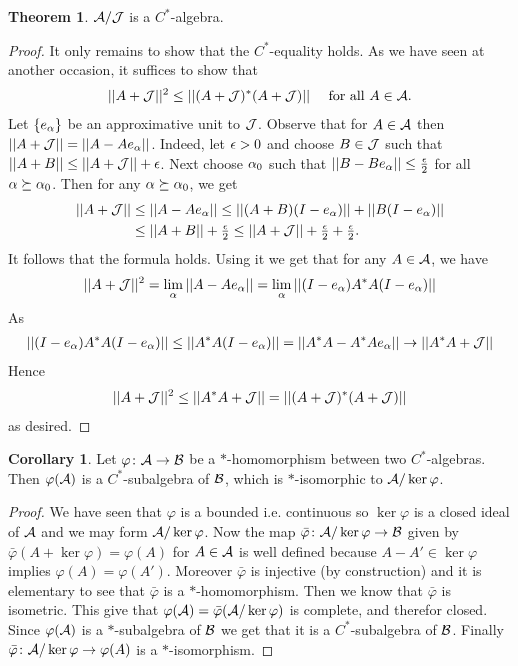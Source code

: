 \documentclass[10pt,english,a4paper]{article}
\theoremstyle{definition}
\newtheorem*{theorem}{Theorem}
\newtheorem*{corollary}{Corollary}
\begin{document}
\begin{theorem}
    $\mathcal{A} /\mathcal{J}$ is a $C^*$-algebra.
\end{theorem}
\begin{proof}
    It only remains to show that the $C^*$-equality holds. As we have seen at
another occasion, it suffices to show that 
\begin{align*}
    ||A+\mathcal{J}||^2 \leq ||(A + \mathcal{J})^*(A+ \mathcal{J})||\quad \text{ for all } A \in \mathcal{A}.
\end{align*}
Let $\{e_{\alpha}\}$ be an approximative unit to $\mathcal{J}$. Observe that for 
$A \in \mathcal{A}$ then $||A + \mathcal{J}|| = ||A-Ae_{\alpha}||$. 
Indeed, let $\epsilon > 0$ and choose $B \in \mathcal{J}$ such that 
$||A+B|| \leq ||A+\mathcal{J}|| + \epsilon$. Next choose $\alpha_0$ such that 
$||B-Be_{\alpha}|| \leq \tfrac{\epsilon}{2}$ for all $\alpha \succeq \alpha_0$. 
Then for any $\alpha \succeq \alpha_0$, we get
\begin{align*}
    ||A+\mathcal{J}|| &\leq ||A-Ae_{\alpha}|| \leq ||(A+B)(I-e_{\alpha})|| + ||B(I-e_{\alpha})|| \\
&\leq ||A+B|| + \tfrac{\epsilon}{2} \leq ||A+\mathcal{J}|| + \tfrac{\epsilon}{2}+ \tfrac{\epsilon}{2}.
\end{align*}
It follows that the formula holds. Using it we get that for any $A \in \mathcal{A}$,
we have
\begin{align*}
    ||A+\mathcal{J}||^2 &= \lim_{\alpha} ||A-Ae_{\alpha}|| = \lim_{\alpha} ||(I-e_{\alpha})A^*A (I-e_{\alpha})||\\
\end{align*}
As
\begin{align*}
    ||(I-e_{\alpha})A^*A (I-e_{\alpha})|| \leq ||A^*A (I-e_{\alpha})|| = ||A^*A-A^*Ae_{\alpha}|| \to || A^*A + \mathcal{J}|| 
\end{align*}
Hence 
\begin{align*}
||A + \mathcal{J}||^2 \leq ||A^*A + \mathcal{J}|| = ||(A + \mathcal{J})^*(A+\mathcal{J})||
\end{align*}
as desired. 
\end{proof}


\begin{corollary}
    Let $\varphi \colon \mathcal{A} \to \mathcal{B}$ be a $*$-homomorphism between two 
$C^*$-algebras. Then $\varphi(\mathcal{A})$ is a $C^*$-subalgebra of $\mathcal{B}$, which 
is $*$-isomorphic to $\mathcal{A} /\ker \varphi$. 
\end{corollary}
\begin{proof}
    We have seen that $\varphi$ is a bounded i.e. continuous so $\ker\varphi$
is a closed ideal of $\mathcal{A}$ and we may form $\mathcal{A}/\ker\varphi$.
Now the map $\bar{\varphi}\colon \mathcal{A}/\ker\varphi \to \mathcal{B}$ given by
$\bar{\varphi}(A + \ker\varphi) = \varphi(A)$ for $A \in \mathcal{A}$ is 
well defined because $A-A' \in \ker\varphi$ implies 
$\varphi(A) = \varphi(A')$.
Moreover $\bar{\varphi}$ is injective (by construction) and 
it is elementary to see that $\bar{\varphi}$ is a $*$-homomorphism. 
Then we know that $\bar{\varphi}$ is isometric. This give that 
$\varphi(\mathcal{A}) = \bar{\varphi} (\mathcal{A}/\ker\varphi)$ is complete, 
and therefor closed. Since $\varphi(\mathcal{A})$ is a $*$-subalgebra of $\mathcal{B}$ we
get that it is a $C^*$-subalgebra of $\mathcal{B}$. 
Finally $\bar{\varphi}\colon \mathcal{A}/\ker\varphi \to \varphi (A)$
is a $*$-isomorphism.
\end{proof}
\end{document}
